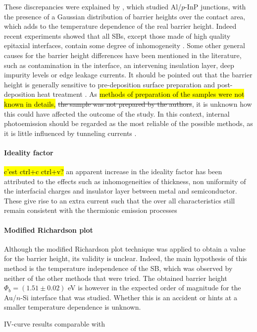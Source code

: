 These discrepancies were explained by \cite{song_difference_1986}, which studied Al/$p$-InP junctions, with the presence of a Gaussian distribution of barrier heights over the contact area, which adds to the temperature dependence of the real barrier height.
Indeed recent experiments showed that all SBs, except those made of high quality epitaxial interfaces, contain some degree of inhomogeneity \cite{tung_recent_2001}.
Some other general causes for the barrier height differences have been mentioned in the literature, such as contamination in the interface, an intervening insulation layer, deep impurity levels or edge leakage currents.
It should be pointed out that the barrier height is generally sensitive to pre-deposition surface preparation and post-deposition heat treatment \cite{sze_physics_2007}.
As \hl{methods of preparation of the samples were not known in details,} \st{the sample was not prepared by the authors}, it is unknown how this could have affected the outcome of the study.
In this context, internal photoemission should be regarded as the most reliable of the possible methods, as it is little influenced by tunneling currents \cite{schroder_semiconductor_2006}.

\paragraph{Ideality factor} \hl{c'est ctrl+c ctrl+v?} an apparent increase in
the ideality factor has been attributed to the effects
such as inhomogeneities of thickness, non uniformity of
the interfacial charges and insulator layer between
metal and semiconductor. These give rise to an extra
current such that the over all characteristics still
remain consistent with the thermionic emission
processes \cite{dhimmar_analysis_2016}

\paragraph{Modified Richardson plot}
Although the modified Richardson plot technique was applied to obtain a value for the barrier height, its validity is unclear. Indeed, the main hypothesis of this method is the temperature independence of the SB, which was observed by neither of the other methods that were tried. The obtained barrier height $\Phi_b = (1.51 \pm 0.02)$ eV is however in the expected order of magnitude for the Au/$n$-Si interface that was studied. Whether this is an accident or hints at a smaller temperature dependence is unknown.

IV-curve results comparable with \cite{dhimmar_analysis_2016}